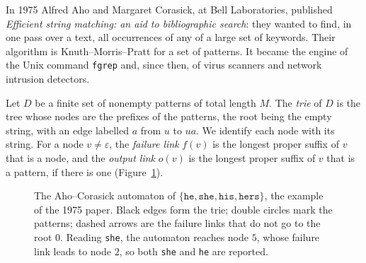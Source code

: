In 1975 Alfred Aho and Margaret Corasick, at Bell Laboratories, published \emph{Efficient string matching: an aid to bibliographic search}: they wanted to find, in one pass over a text, all occurrences of any of a large set of keywords. Their algorithm is Knuth--Morris--Pratt for a set of patterns. It became the engine of the Unix command \texttt{fgrep} and, since then, of virus scanners and network intrusion detectors.

Let $D$ be a finite set of nonempty patterns of total length $M$. The \emph{trie} of $D$ is the tree whose nodes are the prefixes of the patterns, the root being the empty string, with an edge labelled $a$ from $u$ to $ua$. We identify each node with its string. For a node $v\ne\varepsilon$, the \emph{failure link} $f(v)$ is the longest proper suffix of $v$ that is a node, and the \emph{output link} $o(v)$ is the longest proper suffix of $v$ that is a pattern, if there is one (Figure~\ref{fig:aho}).

\begin{figure}[ht]
\centering
{}
\caption{The Aho--Corasick automaton of $\{\texttt{he},\texttt{she},\texttt{his},\texttt{hers}\}$, the example of the 1975 paper. Black edges form the trie; double circles mark the patterns; dashed arrows are the failure links that do not go to the root $0$. Reading \texttt{she}, the automaton reaches node $5$, whose failure link leads to node $2$, so both \texttt{she} and \texttt{he} are reported.}
\label{fig:aho}
\end{figure}

